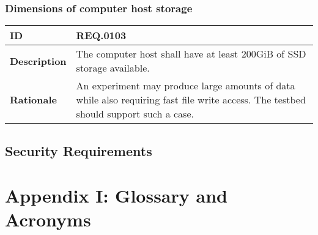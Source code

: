 \documentclass[english,titlepage,a4paper]{report}
\begin{document}
\subsection{Dimensions of computer host storage}
\begin{tabular}{|l|p{9cm}|}
  \hline
  \textbf{ID} & REQ.0103 \\
  \hline
  \textbf{Description} &
  The computer host shall have at least 200GiB of SSD storage available.
  \\
  \hline
  \textbf{Rationale} &
  An experiment may produce large amounts of data while also requiring fast file write access.
  The testbed should support such a case.
  \\
  \hline
\end{tabular}

\section{Security Requirements}


\chapter*{Appendix I: Glossary and Acronyms}

\printglossary
\printglossary[type=\acronymtype]
\end{document}
